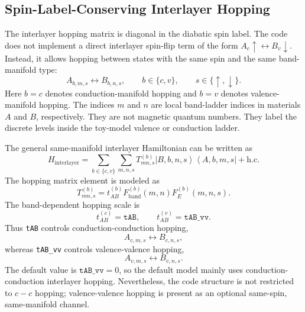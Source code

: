 \documentclass[11pt,a4paper]{article}
\newcommand{\ket}[1]{\left|#1\right\rangle}
\newcommand{\bra}[1]{\left\langle #1\right|}
\begin{document}
\subsection{Spin-Label-Conserving Interlayer Hopping}

The interlayer hopping matrix is diagonal in the diabatic spin label.
The code does not implement a direct interlayer spin-flip term of the form 
\(A_c\uparrow\leftrightarrow B_v\downarrow\).  Instead, it allows hopping between states 
with the same spin and the same band-manifold type:
\begin{equation}
A_{b,m,s}
\leftrightarrow
B_{b,n,s},
\qquad
b\in\{c,v\},
\qquad
s\in\{\uparrow,\downarrow\}.
\end{equation}
Here \(b=c\) denotes conduction-manifold hopping and \(b=v\) denotes valence-manifold hopping.  The indices \(m\) and \(n\) are local band-ladder indices in materials \(A\) and \(B\), respectively.  They are not magnetic quantum numbers.  They label the discrete levels inside the toy-model valence or conduction ladder.

The general same-manifold interlayer Hamiltonian can be written as
\begin{equation}
H_{\mathrm{interlayer}}
=
\sum_{b\in\{c,v\}}
\sum_{m,n,s}
T^{(b)}_{mn,s}
\ket{B,b,n,s}\bra{A,b,m,s}
+
\mathrm{h.c.}
\end{equation}
The hopping matrix element is modeled as
\begin{equation}
T^{(b)}_{mn,s}
=
t^{(b)}_{AB}
F_{\mathrm{band}}^{(b)}(m,n)
F_E^{(b)}(m,n,s).
\end{equation}
The band-dependent hopping scale is
\begin{equation}
t^{(c)}_{AB}=\texttt{tAB},
\qquad
t^{(v)}_{AB}=\texttt{tAB\_vv}.
\end{equation}
Thus \texttt{tAB} controls conduction-conduction hopping,
\begin{equation}
A_{c,m,s}\leftrightarrow B_{c,n,s},
\end{equation}
whereas \texttt{tAB\_vv} controls valence-valence hopping,
\begin{equation}
A_{v,m,s}\leftrightarrow B_{v,n,s}.
\end{equation}
The default value is \(\texttt{tAB\_vv}=0\), so the default model mainly uses conduction-conduction interlayer hopping.  Nevertheless, the code structure is not restricted to \(c-c\) hopping; valence-valence hopping is present as an optional same-spin, same-manifold channel.
\end{document}
